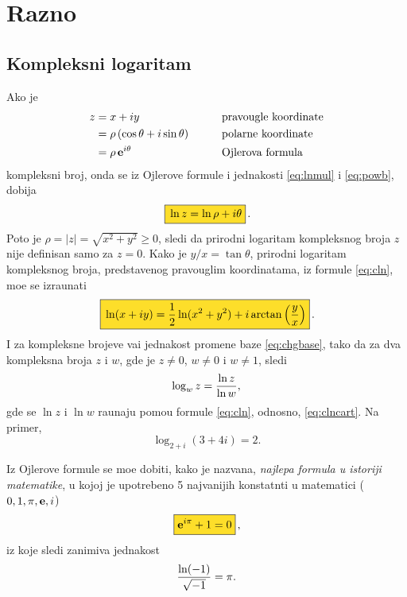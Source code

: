 \documentclass[12pt, twoside, a4paper]{article}
\def\logten{\log_{10}}
\def\.{{,}}
\def\e{{\bf e}}
\begin{document}

\section{Razno}


\subsection{Kompleksni logaritam}

Ako je 
\begin{alignat*}{3}
z 
&= x + iy &&\qquad\text{pravougle koordinate}\\
&= \rho\, (\cos\theta +i\sin\theta)&&\qquad\text{polarne koordinate}\\
& = \rho\, \e^{i\theta}&&\qquad\text{Ojlerova formula}
\end{alignat*}
kompleksni broj, onda se iz Ojlerove formule i jednakosti \eqref{eq:lnmul} i \eqref{eq:powb}, dobija
\begin{equation}
\okvir{\ln z = \ln\rho + i\theta}.
\label{eq:cln}
\end{equation}
Po{\sv}to je $\rho=|z|=\sqrt{x^2+y^2}\ge0$,
sledi da prirodni logaritam kompleksnog broja $z$ nije definisan samo za $z=0$.
Kako je $y/x=\tan\theta$, prirodni logaritam kompleksnog broja,
pred\-stav\-{\lj}e\-nog pravouglim koordinatama, iz formule \eqref{eq:cln},
mo{\zv}e se izra{\cv}unati
\begin{equation}
\okvir{\ln(x+iy)={1\over2}\ln(x^2+y^2)+i\arctan\left({y\over x}\right)}.
\label{eq:clncart}
\end{equation}
I za kompleksne brojeve va{\zv}i jednakost promene baze \eqref{eq:chgbase}, tako da za dva kompleksna
broja $z$ i $w$, gde je $z\ne0$, $w\ne0$ i $w\ne1$, sledi
$$
\log_w z={\ln z\over \ln w},
$$
gde se $\ln z$ i $\ln w$ ra{\cv}unaju pomo{\cc}u formule \eqref{eq:cln}, odnosno, \eqref{eq:clncart}.
Na primer,
$$
\log_{2+i}(3+4i)=2.
$$

\medskip

Iz Ojlerove formule se mo{\zv}e dobiti, kako je nazvana, 
{\sl najlep{\sv}a formula u istoriji ma\-te\-ma\-ti\-ke},
u kojoj je upotreb{\lj}eno 5 najva{\zv}nijih konstatnti u matematici 
($0,1,\pi,\e,i$)
$$
\okvir{\e^{i\pi}+1=0},
$$
iz koje sledi zanim{\lj}iva jednakost
$$
{\ln(-1)\over\sqrt{-1}}=\pi.
$$
\end{document}
